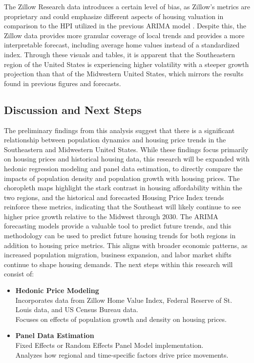 \documentclass[journal,article,submit,pdftex,moreauthors]{Definitions/mdpi}
\begin{document}
The Zillow Research data introduces a certain level of bias, as Zillow’s metrics are proprietary and could emphasize different aspects of housing valuation in comparison to the HPI utilized in the previous ARIMA model \citep{zillow_2024_housing}. Despite this, the Zillow data provides more granular coverage of local trends and provides a more interpretable forecast, including average home values instead of a standardized index. Through these visuals and tables, it is apparent that the Southeastern region of the United States is experiencing higher volatility with a steeper growth projection than that of the Midwestern United States, which mirrors the results found in previous figures and forecasts.

\subsection{Discussion and Next Steps}

The preliminary findings from this analysis suggest that there is a significant relationship between population dynamics and housing price trends in the Southeastern and Midwestern United States. While these findings focus primarily on housing prices and historical housing data, this research will be expanded with hedonic regression modeling and panel data estimation, to directly compare the impacts of population density and population growth with housing prices. The choropleth maps highlight the stark contrast in housing affordability within the two regions, and the historical and forecasted Housing Price Index trends reinforce these metrics, indicating that the Southeast will likely continue to see higher price growth relative to the Midwest through 2030. The ARIMA forecasting models provide a valuable tool to predict future trends, and this methodology can be used to predict future housing trends for both regions in addition to housing price metrics. This aligns with broader economic patterns, as increased population migration, business expansion, and labor market shifts continue to shape housing demands. The next steps within this research will consist of:

\begin{itemize}
    \item \textbf{Hedonic Price Modeling} \\
    Incorporates data from Zillow Home Value Index, Federal Reserve of St. Louis data, and US Census Bureau data. \\
    Focuses on effects of population growth and density on housing prices.

    \item \textbf{Panel Data Estimation} \\
    Fixed Effects or Random Effects Panel Model implementation. \\
    Analyzes how regional and time-specific factors drive price movements.
\end{itemize}
\end{document}
